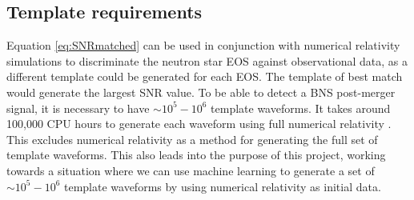 \subsection{Template requirements}
\label{sec:template}
	Equation \ref{eq:SNRmatched} can be used in conjunction with numerical relativity simulations to discriminate the neutron star EOS against observational data, as a different template could be generated for each EOS. The template of best match would generate the largest SNR value. To be able to detect a BNS post-merger signal, it is necessary to have $\sim 10^5 - 10^6$ template waveforms. It takes around 100,000 CPU hours to generate each waveform using full numerical relativity \citep{Takami2015}. This excludes numerical relativity as a method for generating the full set of template waveforms. This also leads into the purpose of this project, working towards a situation where we can use machine learning to generate a set of $\sim 10^5 - 10^6$ template waveforms by using numerical relativity as initial data. 

